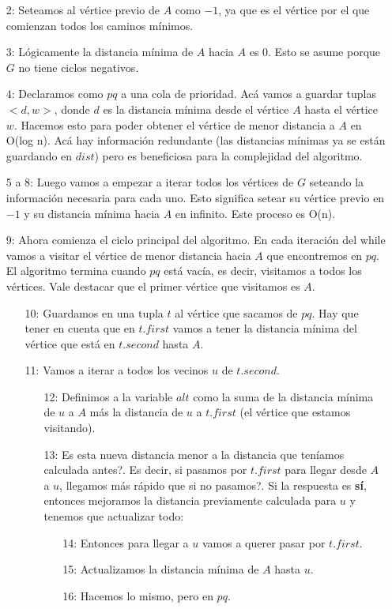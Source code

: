 \begin{enumerate}
\item [2:] Seteamos al v\'ertice previo de $A$ como $-1$, ya que es el v\'ertice por el que comienzan todos los caminos m\'inimos.
\item [3:] L\'ogicamente la distancia m\'inima de $A$ hacia $A$ es 0. Esto se asume porque $G$ no tiene ciclos negativos.
\item [4:] Declaramos como $pq$ a una cola de prioridad. Ac\'a vamos a guardar tuplas $<d, w>$, donde $d$ es la distancia m\'inima desde el v\'ertice $A$ hasta el v\'ertice $w$. Hacemos esto para poder obtener el v\'ertice de menor distancia a $A$ en O(log n). Ac\'a hay informaci\'on redundante (las distancias m\'inimas ya se est\'an guardando en $dist$) pero es beneficiosa para la complejidad del algoritmo.
\item [5 a 8:] Luego vamos a empezar a iterar todos los v\'ertices de $G$ seteando la informaci\'on necesaria para cada uno. Esto significa setear su v\'ertice previo en $-1$ y su distancia m\'inima hacia $A$ en infinito. Este proceso es O(n).
\item [9:] Ahora comienza el ciclo principal del algoritmo. En cada iteraci\'on del while vamos a visitar el v\'ertice de menor distancia hacia $A$ que encontremos en $pq$. El algoritmo termina cuando $pq$ est\'a vac\'ia, es decir, visitamos a todos los v\'ertices. Vale destacar que el primer v\'ertice que visitamos es $A$.
    \begin{enumerate}
    \item [10:] Guardamos en una tupla $t$ al v\'ertice que sacamos de $pq$. Hay que tener en cuenta que en $t.first$ vamos a tener la distancia m\'inima del v\'ertice que est\'a en $t.second$ hasta $A$.
    \item [11:] Vamos a iterar a todos los vecinos $u$ de $t.second$.
        \begin{enumerate}
        \item [12:] Definimos a la variable $alt$ como la suma de la distancia m\'inima de $u$ a $A$ m\'as la distancia de $u$ a $t.first$ (el v\'ertice que estamos visitando).
        \item [13:] \¿Es esta nueva distancia menor a la distancia que ten\'iamos calculada antes?. Es decir, \¿si pasamos por $t.first$ para llegar desde $A$ a $u$, llegamos m\'as r\'apido que si no pasamos?. Si la respuesta es \textbf{s\'i}, entonces mejoramos la distancia previamente calculada para $u$ y tenemos que actualizar todo:
            \begin{enumerate}
            \item [14:] Entonces para llegar a $u$ vamos a querer pasar por $t.first$.
            \item [15:] Actualizamos la distancia m\'inima de $A$ hasta $u$.
            \item [16:] Hacemos lo mismo, pero en $pq$.
            \end{enumerate}
        \end{enumerate}
    \end{enumerate}
\end{enumerate}

